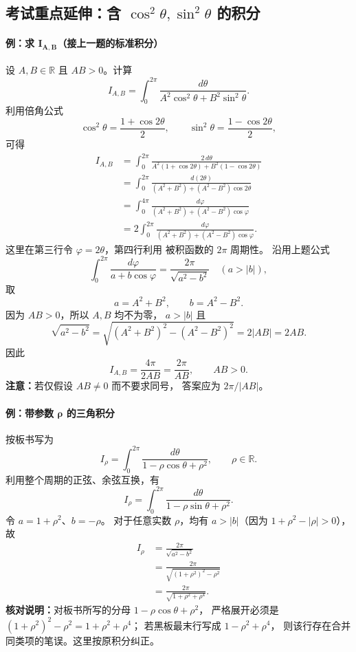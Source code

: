 \subsection*{考试重点延伸：含 $\cos^2\theta,\sin^2\theta$ 的积分}

\paragraph{例：求 $\boldsymbol{I_{A,B}}$（接上一题的标准积分）}
设 $A,B\in\mathbb R$ 且 $AB>0$。计算
\[
  I_{A,B}
   =\int_0^{2\pi}
     \frac{d\theta}{A^2\cos^2\theta+B^2\sin^2\theta}.
\]
利用倍角公式
\[
  \cos^2\theta=\frac{1+\cos2\theta}{2},
  \qquad
  \sin^2\theta=\frac{1-\cos2\theta}{2},
\]
可得
\begin{align*}
  I_{A,B}
  &=\int_0^{2\pi}
      \frac{2\,d\theta}
      {A^2(1+\cos2\theta)+B^2(1-\cos2\theta)}\\
  &=\int_0^{2\pi}
      \frac{d(2\theta)}
      {(A^2+B^2)+(A^2-B^2)\cos2\theta}\\
  &=\int_0^{4\pi}
      \frac{d\varphi}
      {(A^2+B^2)+(A^2-B^2)\cos\varphi}\\
  &=2\int_0^{2\pi}
      \frac{d\varphi}
      {(A^2+B^2)+(A^2-B^2)\cos\varphi}.
\end{align*}
这里在第三行令 $\varphi=2\theta$，第四行利用
被积函数的 $2\pi$ 周期性。
沿用上题公式
\[
  \int_0^{2\pi}\frac{d\varphi}{a+b\cos\varphi}
     =\frac{2\pi}{\sqrt{a^2-b^2}}\quad(a>|b|),
\]
取
\[
  a=A^2+B^2,\qquad b=A^2-B^2.
\]
因为 $AB>0$，所以 $A,B$ 均不为零，
$a>|b|$ 且
\[
  \sqrt{a^2-b^2}
  =\sqrt{(A^2+B^2)^2-(A^2-B^2)^2}
  =2|AB|=2AB.
\]
因此
\[
  \boxed{
  I_{A,B}=\frac{4\pi}{2AB}=\frac{2\pi}{AB},
  \qquad AB>0.}
\]
\textbf{注意：}若仅假设 $AB\ne0$ 而不要求同号，
答案应为 $2\pi/|AB|$。

\paragraph{例：带参数 $\boldsymbol{\rho}$ 的三角积分}
按板书写为
\[
  I_{\rho}
   =\int_0^{2\pi}
     \frac{d\theta}{1-\rho\cos\theta+\rho^2},
  \qquad \rho\in\mathbb R.
\]
利用整个周期的正弦、余弦互换，有
\[
  I_{\rho}
  =\int_0^{2\pi}
     \frac{d\theta}{1-\rho\sin\theta+\rho^2}.
\]
令 $a=1+\rho^2$、$b=-\rho$。
对于任意实数 $\rho$，均有
$a>|b|$（因为 $1+\rho^2-|\rho|>0$），故
\begin{align*}
  I_{\rho}
   &=\frac{2\pi}{\sqrt{a^2-b^2}}\\
   &=\frac{2\pi}
      {\sqrt{(1+\rho^2)^2-\rho^2}}\\
   &=\boxed{\frac{2\pi}{\sqrt{1+\rho^2+\rho^4}}}.
\end{align*}
\textbf{核对说明：}对板书所写的分母
$1-\rho\cos\theta+\rho^2$，
严格展开必须是
$(1+\rho^2)^2-\rho^2=1+\rho^2+\rho^4$；
若黑板最末行写成 $1-\rho^2+\rho^4$，
则该行存在合并同类项的笔误。这里按原积分纠正。


